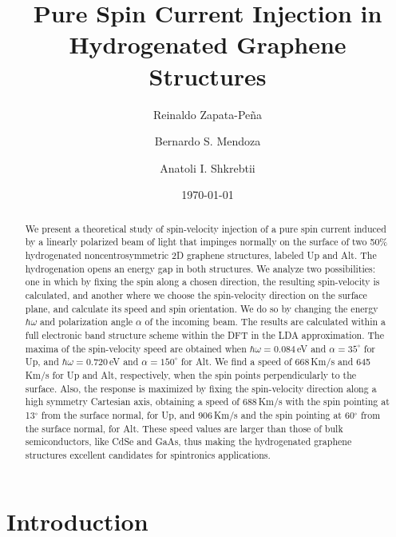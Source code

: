 \documentclass[floatfix,prb,aps,superscriptaddress,showpacs,11pt,preprint,letterpaper]{revtex4}
\begin{document}
\title{Pure Spin Current Injection in Hydrogenated Graphene Structures}
\author{Reinaldo Zapata-Pe\~na}
\author{Bernardo S. Mendoza}
\author{Anatoli I. Shkrebtii}

\date{\today}

\begin{abstract}
We present a theoretical study of spin-velocity injection of a pure spin current
induced by  a linearly polarized beam of light that impinges normally on the
surface of  two 50\% hydrogenated noncentrosymmetric 2D graphene structures,
labeled Up and Alt. The hydrogenation opens an energy gap in both structures. We
analyze two possibilities: one in which by fixing the spin along a chosen
direction, the resulting spin-velocity is calculated, and another where we
choose the spin-velocity direction on the surface plane, and calculate its speed
and spin orientation. We do so by changing the energy $\hbar\omega$ and
polarization angle $\alpha$  of the incoming  beam. The results are calculated
within a full electronic band structure scheme within the DFT in the LDA
approximation. The maxima of the spin-velocity speed are obtained when
$\hbar\omega = 0.084$\,eV and $\alpha=35^\circ$ for Up, and $\hbar\omega =
0.720$\,eV and $\alpha=150^\circ$ for Alt. We find a speed of 668\,Km/s and
645\,Km/s for Up and Alt, respectively, when the spin points perpendicularly to
the surface. Also, the response is maximized by fixing the spin-velocity
direction along a high symmetry Cartesian axis, obtaining a speed of 688\,Km/s
with the spin  pointing at 13$^\circ$ from the surface normal, for Up, and
906\,Km/s and the spin pointing at 60$^\circ$ from the surface normal, for Alt.
These speed values are larger than those of bulk semiconductors, like CdSe and
GaAs, thus making the hydrogenated graphene structures excellent candidates for
spintronics applications.
\end{abstract}

\maketitle

\section{Introduction}
\label{sec:introduction}
\end{document}
